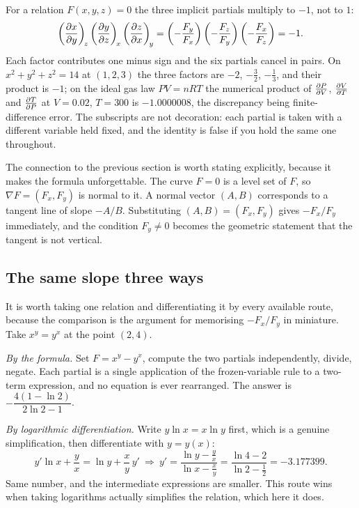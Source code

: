 \begin{keynote}
For a relation $F(x,y,z)=0$ the three implicit partials multiply to $-1$, not to $1$:
\[
\left(\frac{\partial x}{\partial y}\right)_{\!z}\left(\frac{\partial y}{\partial z}\right)_{\!x}\left(\frac{\partial z}{\partial x}\right)_{\!y}
=\left(-\frac{F_{y}}{F_{x}}\right)\left(-\frac{F_{z}}{F_{y}}\right)\left(-\frac{F_{x}}{F_{z}}\right)=-1 .
\]
Each factor contributes one minus sign and the six partials cancel in pairs. On $x^{2}+y^{2}+z^{2}=14$ at $(1,2,3)$ the three factors are $-2$, $-\tfrac32$, $-\tfrac13$, and their product is $-1$; on the ideal gas law $PV=nRT$ the numerical product of $\frac{\partial P}{\partial V}$, $\frac{\partial V}{\partial T}$ and $\frac{\partial T}{\partial P}$ at $V=0.02$, $T=300$ is $-1.0000008$, the discrepancy being finite-difference error. The subscripts are not decoration: each partial is taken with a different variable held fixed, and the identity is false if you hold the same one throughout.
\end{keynote}

The connection to the previous section is worth stating explicitly, because it makes the formula unforgettable. The curve $F=0$ is a level set of $F$, so $\nabla F=(F_{x},F_{y})$ is normal to it. A normal vector $(A,B)$ corresponds to a tangent line of slope $-A/B$. Substituting $(A,B)=(F_{x},F_{y})$ gives $-F_{x}/F_{y}$ immediately, and the condition $F_{y}\neq0$ becomes the geometric statement that the tangent is not vertical.

\subsection{The same slope three ways}

It is worth taking one relation and differentiating it by every available route, because the comparison is the argument for memorising $-F_{x}/F_{y}$ in miniature. Take $x^{y}=y^{x}$ at the point $(2,4)$.

\emph{By the formula.} Set $F=x^{y}-y^{x}$, compute the two partials independently, divide, negate. Each partial is a single application of the frozen-variable rule to a two-term expression, and no equation is ever rearranged. The answer is $-\dfrac{4(1-\ln2)}{2\ln2-1}$.

\emph{By logarithmic differentiation.} Write $y\ln x=x\ln y$ first, which is a genuine simplification, then differentiate with $y=y(x)$:
\[
y'\ln x+\frac{y}{x}=\ln y+\frac{x}{y}\,y' \ \Longrightarrow\ y'=\frac{\ln y-\tfrac{y}{x}}{\ln x-\tfrac{x}{y}}
=\frac{\ln 4-2}{\ln 2-\tfrac12}=-3.177399 .
\]
Same number, and the intermediate expressions are smaller. This route wins when taking logarithms actually simplifies the relation, which here it does.

